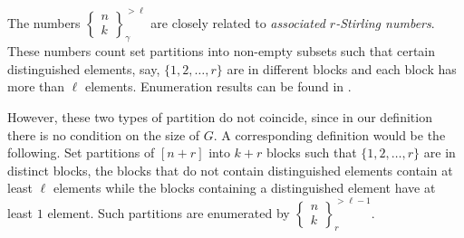 \documentclass[12pt, reqno]{amsart}
\newtheorem{proof 1}{proof 1}
\def\sts#1#2{\begin{Bmatrix}
#1 \\ #2 \end{Bmatrix}}
\begin{document}
The numbers $\sts{n}{k}_{\gamma}^{>\ell}$ are closely related to \emph{associated $r$-Stirling numbers}. These numbers count set partitions into non-empty subsets such that certain distinguished elements, say, $\{1,2,\ldots, r\}$ are in different blocks and each block has more than $\ell$ elements. Enumeration results can be found in \cite{BenyiMendez2019}. 

However, these two types of partition do not coincide, since in our definition there is no condition on the size of $G$. A corresponding definition would be the following. Set partitions of $[n+r]$ into $k+r$ blocks such that $\{1,2,\ldots, r\}$ are in distinct blocks, the blocks that do not contain distinguished elements contain at least $\ell$ elements while the blocks containing a distinguished element have at least $1$ element. Such partitions are enumerated by $\sts{n}{k}_r^{>\ell-1}$. 
\end{document}
